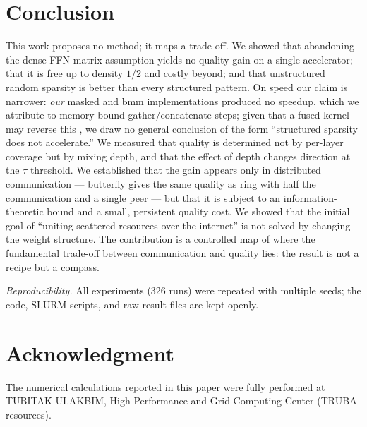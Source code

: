 \documentclass[10pt,journal]{IEEEtran}
\begin{document}
\section{Conclusion}
This work proposes no method; it maps a trade-off. We showed that abandoning the dense FFN matrix
assumption yields no quality gain on a single accelerator; that it is free up to
density $1/2$ and costly beyond; and that unstructured random sparsity is better than every
structured pattern. On speed our claim is narrower: \emph{our} masked and bmm implementations
produced no speedup, which we attribute to memory-bound gather/concatenate steps; given that a
fused kernel may reverse this \cite{dao2022}, we draw no general conclusion of the form
``structured sparsity does not accelerate.'' We measured that quality is determined not by
per-layer coverage but by mixing depth, and that the effect of depth changes direction at the
$\tau$ threshold. We established that the gain appears only in distributed communication ---
butterfly gives the same quality as ring with half the communication and a single peer --- but
that it is subject to an information-theoretic bound and a small, persistent quality cost. We
showed that the initial goal of ``uniting scattered resources over the internet'' is not solved
by changing the weight structure. The contribution is a controlled map of where the fundamental
trade-off between communication and quality lies: the result is not a recipe but a compass.

\emph{Reproducibility.} All experiments (326 runs) were repeated with multiple seeds; the code,
SLURM scripts, and raw result files are kept openly.

\section*{Acknowledgment}
The numerical calculations reported in this paper were fully performed at TUBITAK ULAKBIM, High
Performance and Grid Computing Center (TRUBA resources).
\end{document}

